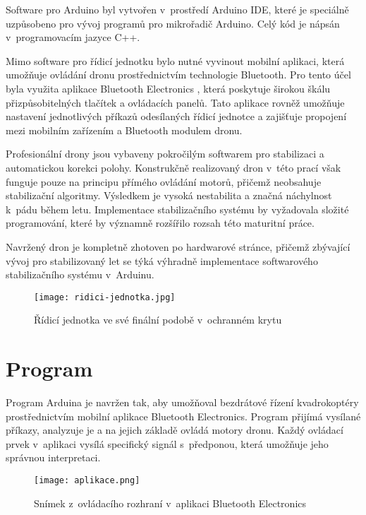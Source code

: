 \documentclass[12pt]{report}
\begin{document}
Software pro Arduino byl vytvořen v~prostředí Arduino IDE, které je speciálně uzpůsobeno pro vývoj programů pro mikrořadič Arduino. Celý kód je nápsán v~programovacím jazyce C++.

Mimo software pro řídicí jednotku bylo nutné vyvinout mobilní aplikaci, která umožňuje ovládání dronu prostřednictvím technologie Bluetooth. Pro tento účel byla využita aplikace Bluetooth Electronics \cite{be}, která poskytuje širokou škálu přizpůsobitelných tlačítek a ovládacích panelů. Tato aplikace rovněž umožňuje nastavení jednotlivých příkazů odesílaných řídicí jednotce a zajišťuje propojení mezi mobilním zařízením a Bluetooth modulem dronu.

Profesionální drony jsou vybaveny pokročilým softwarem pro stabilizaci a automatickou korekci polohy. Konstrukčně realizovaný dron v~této prací však funguje pouze na principu přímého ovládání motorů, přičemž neobsahuje stabilizační algoritmy. Výsledkem je vysoká nestabilita a značná náchylnost k~pádu během letu. Implementace stabilizačního systému by vyžadovala složité programování, které by významně rozšířilo rozsah této maturitní práce.

Navržený dron je kompletně zhotoven po hardwarové stránce, přičemž zbývající vývoj pro stabilizovaný let se týká výhradně implementace softwarového stabilizačního systému v~Arduinu.

\begin{figure}[H]
	\centering
	\texttt{[image: ridici-jednotka.jpg]}
	\caption{Řídicí jednotka ve své finální podobě v~ochranném krytu}
	\label{fig:ridici-jednotka.jpg}
\end{figure}

\chapter[Program]{Program}
Program Arduina je navržen tak, aby umožňoval bezdrátové řízení kvadrokoptéry prostřednictvím mobilní aplikace Bluetooth Electronics. Program přijímá vysílané příkazy, analyzuje je a na jejich základě ovládá motory dronu. Každý ovládací prvek v~aplikaci vysílá specifický signál s~předponou, která umožňuje jeho správnou interpretaci.

\begin{figure}[H]
	\centering
	\texttt{[image: aplikace.png]}
	\caption{Snímek z~ovládacího rozhraní v~aplikaci Bluetooth Electronics}
	\label{fig:aplikace.png}
\end{figure}
\end{document}
